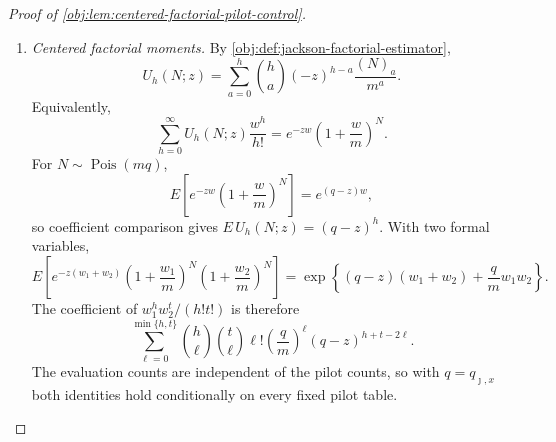 \begin{proof}[Proof of \cref{obj:lem:centered-factorial-pilot-control}]
\begin{enumerate}
\item \label{item:pf-centered-factorial-moments}\emph{Centered factorial moments.}
By \cref{obj:def:jackson-factorial-estimator},
\[
U_h(N;z)=\sum_{a=0}^{h}\binom ha(-z)^{h-a}\frac{(N)_a}{m^a}.
\]
Equivalently,
\[
\sum_{h=0}^{\infty}U_h(N;z)\frac{w^h}{h!}
=
e^{-zw}\left(1+\frac wm\right)^N .
\]
For \(N\sim\operatorname{Pois}(mq)\),
\[
E\left[e^{-zw}\left(1+\frac wm\right)^N\right]
=
e^{(q-z)w},
\]
so coefficient comparison gives \(E\,U_h(N;z)=(q-z)^h\).  With two formal variables,
\[
E\left[
e^{-z(w_1+w_2)}
\left(1+\frac {w_1}m\right)^N
\left(1+\frac {w_2}m\right)^N
\right]
=
\exp\left\{(q-z)(w_1+w_2)+\frac qm w_1w_2\right\}.
\]
The coefficient of \(w_1^h w_2^t/(h!t!)\) is therefore
\[
\sum_{\ell=0}^{\min\{h,t\}}
\binom h\ell\binom t\ell\ell!
\left(\frac qm\right)^\ell
(q-z)^{h+t-2\ell}.
\]
The evaluation counts are independent of the pilot counts, so with
\(q=q_{\jmath,x}\) both identities hold conditionally on every fixed pilot table.


\end{enumerate}
\end{proof}
